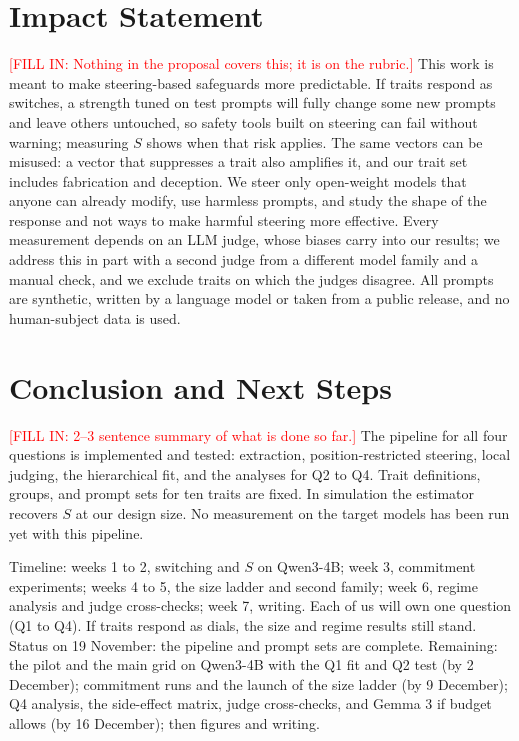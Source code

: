 \documentclass[11pt]{article}
\newcommand{\fillin}[1]{\textcolor{red}{[FILL IN: #1]}}
\newcommand{\upd}[1]{{\color{updgreen}#1}}
\begin{document}
\section{Impact Statement}
\fillin{Nothing in the proposal covers this; it is on the rubric.}
\upd{This work is meant to make steering-based safeguards more predictable. If
traits respond as switches, a strength tuned on test prompts will fully change
some new prompts and leave others untouched, so safety tools built on steering
can fail without warning; measuring $S$ shows when that risk applies. The same
vectors can be misused: a vector that suppresses a trait also amplifies it, and
our trait set includes fabrication and deception. We steer only open-weight
models that anyone can already modify, use harmless prompts, and study the shape
of the response and not ways to make harmful steering more effective. Every
measurement depends on an LLM judge, whose biases carry into our results; we
address this in part with a second judge from a different model family and a
manual check, and we exclude traits on which the judges disagree. All prompts
are synthetic, written by a language model or taken from a public release, and
no human-subject data is used.}

\section{Conclusion and Next Steps}
\fillin{2--3 sentence summary of what is done so far.}
\upd{The pipeline for all four questions is implemented and tested: extraction,
position-restricted steering, local judging, the hierarchical fit, and the
analyses for Q2 to Q4. Trait definitions, groups, and prompt sets for ten traits
are fixed. In simulation the estimator recovers $S$ at our design size. No
measurement on the target models has been run yet with this pipeline.}

Timeline: weeks 1 to 2, switching and $S$ on Qwen3-4B; week 3, commitment experiments;
weeks 4 to 5, the size ladder and second family; week 6, regime analysis and judge
cross-checks; week 7, writing. Each of us will own one question (Q1 to Q4). If traits
respond as dials, the size and regime results still stand.
\upd{Status on 19 November: the pipeline and prompt sets are complete. Remaining:
the pilot and the main grid on Qwen3-4B with the Q1 fit and Q2 test (by 2
December); commitment runs and the launch of the size ladder (by 9 December); Q4
analysis, the side-effect matrix, judge cross-checks, and Gemma 3 if budget
allows (by 16 December); then figures and writing.}
\end{document}
